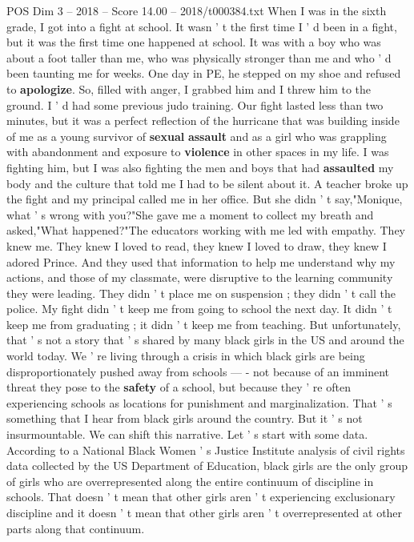 \begin{textsample}{POS Dim 3 – 2018 – Score 14.00 – 2018/t000384.txt}  \label{ex:f3_pos_018}
When I was in the sixth grade, I got into a fight at school.
It wasn ' t the first time I ' d been in a fight, but it was the first time one happened at school.
It was with a boy who was about a foot taller than me, who was physically stronger than me and who ' d been taunting me for weeks.
One day in PE, he stepped on my shoe and refused to \textbf{apologize}.
So, filled with anger, I grabbed him and I threw him to the ground.
I ' d had some previous judo training.
Our fight lasted less than two minutes, but it was a perfect reflection of the hurricane that was building inside of me as a young survivor of \textbf{sexual} \textbf{assault} and as a girl who was grappling with abandonment and exposure to \textbf{violence} in other spaces in my life.
I was fighting him, but I was also fighting the men and boys that had \textbf{assaulted} my body and the culture that told me I had to be silent about it.
A teacher broke up the fight and my principal called me in her office.
But she didn ' t say,"Monique, what ' s wrong with you?"She gave me a moment to collect my breath and asked,"What happened?"The educators working with me led with empathy.
They knew me.
They knew I loved to read, they knew I loved to draw, they knew I adored Prince.
And they used that information to help me understand why my actions, and those of my classmate, were disruptive to the learning community they were leading.
They didn ' t place me on suspension ; they didn ' t call the police.
My fight didn ' t keep me from going to school the next day.
It didn ' t keep me from graduating ; it didn ' t keep me from teaching.
But unfortunately, that ' s not a story that ' s shared by many black girls in the US and around the world today.
We ' re living through a crisis in which black girls are being disproportionately pushed away from schools — - not because of an imminent threat they pose to the \textbf{safety} of a school, but because they ' re often experiencing schools as locations for punishment and marginalization.
That ' s something that I hear from black girls around the country.
But it ' s not insurmountable.
We can shift this narrative.
Let ' s start with some data.
According to a National Black Women ' s Justice Institute analysis of civil rights data collected by the US Department of Education, black girls are the only group of girls who are overrepresented along the entire continuum of discipline in schools.
That doesn ' t mean that other girls aren ' t experiencing exclusionary discipline and it doesn ' t mean that other girls aren ' t overrepresented at other parts along that continuum.

\end{textsample}
